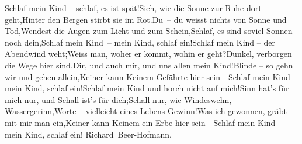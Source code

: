 \begin{ledgroupsized}[t]{13cm}
           {\bigskip}\stanza{}Schlaf mein Kind – schlaf, es ist spät!\newverse{}Sieh, wie die Sonne zur Ruhe dort geht,\newverse{}Hinter den Bergen stirbt sie im Rot.\newverse{}Du – du weisst nichts von Sonne und Tod,\newverse{}Wendest die Augen zum Licht und zum Schein,\newverse{}Schlaf, es sind soviel Sonnen noch dein,\newverse{}Schlaf mein Kind – mein Kind, schlaf ein!\stanzaend{}\stanza{}Schlaf mein Kind – der Abendwind weht;\newverse{}Weiss man, woher er kommt, wohin er geht?\newverse{}Dunkel, verborgen die Wege hier sind,\newverse{}Dir, und auch mir, und uns allen mein Kind!\newverse{}Blinde – so gehn wir und gehen allein,\newverse{}Keiner kann Keinem Gefährte hier sein –\newverse{}Schlaf mein Kind – mein Kind, schlaf ein!\stanzaend{}\stanza{}Schlaf mein Kind und horch nicht auf mich!\newverse{}Sinn hat’s für mich nur, und Schall ist’s für dich;\newverse{}Schall nur, wie Windeswehn, Wassergerinn,\newverse{}Worte – vielleicht eines Lebens Gewinn!\newverse{}Was ich gewonnen, gräbt mit mir man ein,\newverse{}Keiner kann Keinem ein Erbe hier sein –\newverse{}Schlaf mein Kind – mein Kind, schlaf ein!\stanzaend{}\pstart
           \spacefill\mbox{Richard Beer-Hofmann.}\pend
           
         
         \endnumbering{}\end{ledgroupsized}  \newcommand{\dateiname}{L01942}\newcommand{\titel}{Richard Beer-Hofmann an Arthur Schnitzler, 7. 7. 1910}\newcommand{\editorInnen}{Martin Anton Müller und Gerd-Hermann Susen}
      